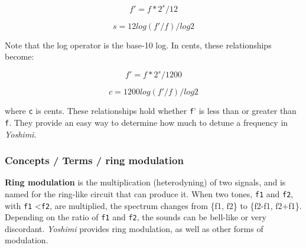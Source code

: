    \[f' = f * 2^s/12\]

   \[s = 12 log (f'/f) / log 2\]

   Note that the log operator is the base-10 log.
   In cents, these relationships become:

   \[f' = f * 2^s/1200\]

   \[c = 1200 log (f'/f) / log 2\]

   where \texttt{c} is cents.
   These relationships hold whether \texttt{f}' is less than or greater than
   \texttt{f}.  They provide an easy way to determine how much to detune a
   frequency in \textsl{Yoshimi}.

\subsubsection{Concepts / Terms / ring modulation}
\label{subsubsec:concepts_terms_ring_mod}

   \textbf{Ring modulation}
   is the multiplication (heterodyning) of two signals, and is named for the
   ring-like circuit that can produce it.
   When two tones, \texttt{f1} and \texttt{f2}, with 
   \texttt{f1} \textless \texttt{f2}, are multiplied, the spectrum
   changes from \{f1, f2\} to \{f2-f1, f2+f1\}.
   Depending on the ratio of \texttt{f1} and \texttt{f2}, the
   sounds can be bell-like or very discordant.
   \textsl{Yoshimi} provides ring modulation, as well as other forms of
   modulation.

